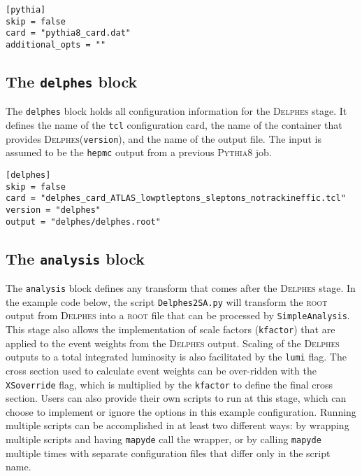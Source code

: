 \documentclass{article}
\newcommand{\mapyde}{\texttt{mapyde}}
\newcommand{\simpleanalysis}{\texttt{SimpleAnalysis}}
\newcommand{\pythia}{\textsc{Pythia8}}
\newcommand{\delphes}{\textsc{Delphes}}
\newcommand{\ROOT}{\textsc{root}}
\newcommand{\toml}{\textsc{toml}}
\begin{document}
\begin{listing}[H]
	\begin{verbatim}
[pythia]
skip = false
card = "pythia8_card.dat"
additional_opts = ""
        \end{verbatim}
	\caption{The \texttt{pythia} block of an example \toml{} configuration file for generating slepton events.}
	\label{slepton-config-pythia}
\end{listing}

\subsection{The \texttt{delphes} block}
\label{ssec:the-delphes-block}

The \texttt{delphes} block holds all configuration information for the \delphes{} stage.  It defines the name of the \texttt{tcl} configuration card, the name of the container that provides \delphes (\texttt{version}), and the name of the output file.  The input is assumed to be the \texttt{hepmc} output from a previous \pythia{} job.

\begin{listing}[H]
	\begin{verbatim}
[delphes]
skip = false
card = "delphes_card_ATLAS_lowptleptons_sleptons_notrackineffic.tcl"
version = "delphes"
output = "delphes/delphes.root"
        \end{verbatim}
	\caption{The \texttt{delphes} block of an example \toml{} configuration file for generating slepton events.}
	\label{slepton-config-delphes}
\end{listing}

\subsection{The \texttt{analysis} block}
\label{ssec:the-analysis-block}

The \texttt{analysis} block defines any transform that comes after the \delphes{} stage.  In the example code below, the script \texttt{Delphes2SA.py} will transform the \ROOT{} output from \delphes{} into a \ROOT{} file that can be processed by \simpleanalysis.  This stage also allows the implementation of scale factors (\texttt{kfactor}) that are applied to the event weights from the \delphes{} output.  Scaling of the \delphes{} outputs to a total integrated luminosity is also facilitated by the \texttt{lumi} flag.  The cross section used to calculate event weights can be over-ridden with the \texttt{XSoverride} flag, which is multiplied by the \texttt{kfactor} to define the final cross section.  Users can also provide their own scripts to run at this stage, which can choose to implement or ignore the options in this example configuration.  Running multiple scripts can be accomplished in at least two different ways: by wrapping multiple scripts and having \mapyde{} call the wrapper, or by calling \mapyde{} multiple times with separate configuration files that differ only in the script name.
\end{document}
